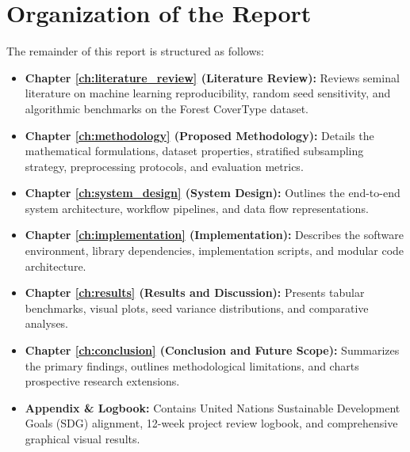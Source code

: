 \section{Organization of the Report}
\label{sec:organization}

The remainder of this report is structured as follows:
\begin{itemize}
    \item \textbf{Chapter \ref{ch:literature_review} (Literature Review):} Reviews seminal literature on machine learning reproducibility, random seed sensitivity, and algorithmic benchmarks on the Forest CoverType dataset.
    \item \textbf{Chapter \ref{ch:methodology} (Proposed Methodology):} Details the mathematical formulations, dataset properties, stratified subsampling strategy, preprocessing protocols, and evaluation metrics.
    \item \textbf{Chapter \ref{ch:system_design} (System Design):} Outlines the end-to-end system architecture, workflow pipelines, and data flow representations.
    \item \textbf{Chapter \ref{ch:implementation} (Implementation):} Describes the software environment, library dependencies, implementation scripts, and modular code architecture.
    \item \textbf{Chapter \ref{ch:results} (Results and Discussion):} Presents tabular benchmarks, visual plots, seed variance distributions, and comparative analyses.
    \item \textbf{Chapter \ref{ch:conclusion} (Conclusion and Future Scope):} Summarizes the primary findings, outlines methodological limitations, and charts prospective research extensions.
    \item \textbf{Appendix \& Logbook:} Contains United Nations Sustainable Development Goals (SDG) alignment, 12-week project review logbook, and comprehensive graphical visual results.
\end{itemize}

